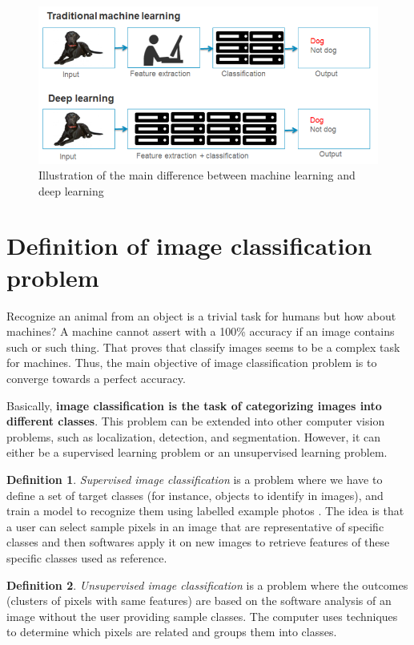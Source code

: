 \documentclass[11pt, openany]{report}
\theoremstyle{plain}
\theoremstyle{definition}
\newtheorem{defn}{Definition}[section]
\theoremstyle{remark}
\begin{document}
\begin{figure}[h]
  \centering
  \includegraphics[scale=0.65]{figures/machineVSdeep.png}
  \caption{Illustration of the main difference between machine learning and deep learning}
  \label{fig:machineVSdeep}
\end{figure}


\section{Definition of image classification problem}
Recognize an animal from an object is a trivial task for humans but how about machines? A machine cannot assert with a 100\% accuracy if an image contains such or such thing. That proves that classify images seems to be a complex task for machines. Thus, the main objective of image classification problem is to converge towards a perfect accuracy. 

Basically, \textbf{image classification is the task of categorizing images into different classes}. This problem can be extended into other computer vision problems, such as localization, detection, and segmentation. However, it can either be a supervised learning problem or an unsupervised learning problem. 

\begin{defn}
\textit{Supervised image classification} is a problem where we have to define a set of target classes (for instance, objects to identify in images), and train a model to recognize them using labelled example photos \cite{Google-2}. The idea is that a user can select sample pixels in an image that are representative of specific classes and then softwares apply it on new images to retrieve features of these specific classes used as reference. 
\end{defn}

\begin{defn}
\textit{Unsupervised image classification} is a problem where the outcomes (clusters of pixels with same features) are based on the software analysis of an image without the user providing sample classes. The computer uses techniques to determine which pixels are related and groups them into classes. 
\end{defn}
\end{document}
